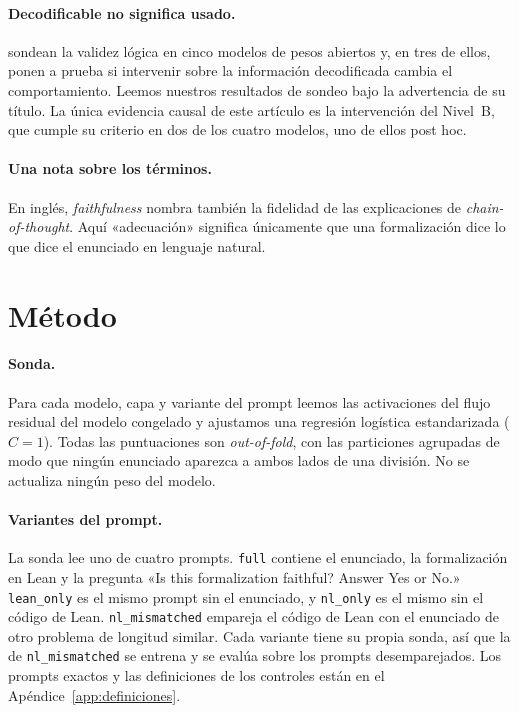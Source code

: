 \documentclass[10pt]{article}
\newcommand{\vr}[1]{\texttt{#1}}
\begin{document}
\paragraph{Decodificable no significa usado.}
\citet{decodability} sondean la validez lógica en cinco modelos de pesos abiertos y, en tres de ellos, ponen a prueba si
intervenir sobre la información decodificada cambia el comportamiento. Leemos nuestros resultados de sondeo bajo la advertencia de su título. La única evidencia causal de este artículo es
la intervención del Nivel~B, que cumple su criterio en dos de los cuatro modelos, uno de ellos post hoc.

\paragraph{Una nota sobre los términos.}
En inglés, \emph{faithfulness} nombra también la fidelidad de las explicaciones de \emph{chain-of-thought}. Aquí
«adecuación» significa únicamente que una formalización dice lo que dice el enunciado en lenguaje natural.

\section{Método}

\paragraph{Sonda.}
Para cada modelo, capa y variante del prompt leemos las activaciones del flujo residual del modelo congelado y
ajustamos una regresión logística estandarizada ($C = 1$). Todas las puntuaciones son \emph{out-of-fold}, con las
particiones agrupadas de modo que ningún enunciado aparezca a ambos lados de una división. No se actualiza ningún
peso del modelo.

\paragraph{Variantes del prompt.}
La sonda lee uno de cuatro prompts. \vr{full} contiene el enunciado, la formalización en Lean y la pregunta
«Is this formalization faithful? Answer Yes or No.» \vr{lean\_only} es el mismo prompt sin el enunciado, y \vr{nl\_only} es el mismo
sin el código de Lean. \vr{nl\_mismatched} empareja el código de Lean con el enunciado de otro problema de longitud similar.
Cada variante tiene su propia sonda, así que la de \vr{nl\_mismatched} se entrena y se evalúa sobre los prompts desemparejados.
Los prompts exactos y las definiciones de los controles están en el Apéndice~\ref{app:definiciones}.
\end{document}

